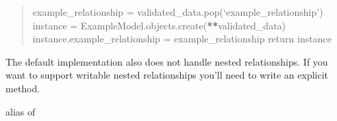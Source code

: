 \documentclass[letterpaper,10pt,english]{sphinxmanual}
\begin{document}
\begin{fulllineitems}
\begin{fulllineitems}
\begin{quote}
\sphinxAtStartPar
example\_relationship = validated\_data.pop(‘example\_relationship’)
instance = ExampleModel.objects.create({\color{red}\bfseries{}**}validated\_data)
instance.example\_relationship = example\_relationship
return instance
\end{quote}

\sphinxAtStartPar
The default implementation also does not handle nested relationships.
If you want to support writable nested relationships you’ll need
to write an explicit  method.

\end{fulllineitems}


\begin{fulllineitems}
\label{\detokenize{tasks:tasks.serializers.TaskSerializer.data}}
\pysigstartsignatures
{}
\pysigstopsignatures
\end{fulllineitems}


\begin{fulllineitems}
\label{\detokenize{tasks:tasks.serializers.TaskSerializer.default_empty_html}}
\pysigstartsignatures
{}
\pysigstopsignatures
\sphinxAtStartPar
alias of 

\end{fulllineitems}


\begin{fulllineitems}
\label{\detokenize{tasks:tasks.serializers.TaskSerializer.default_error_messages}}
\pysigstartsignatures
{}
\pysigstopsignatures
\end{fulllineitems}


\end{fulllineitems}
\end{document}
